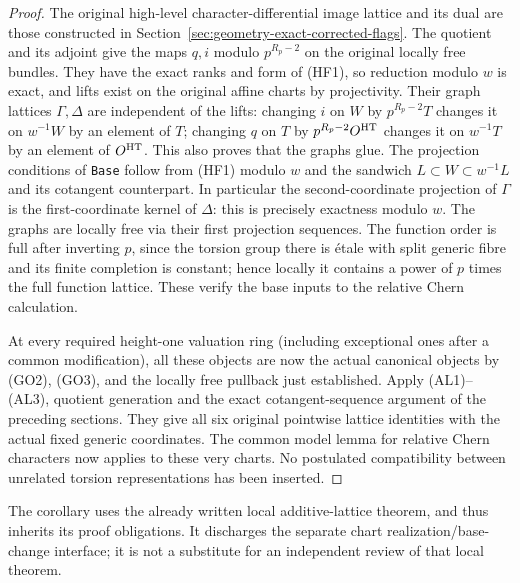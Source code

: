 \begin{proof}
The original high-level character-differential image
lattice and its dual are those constructed in
Section~\ref{sec:geometry-exact-corrected-flags}.
The quotient and its adjoint give the maps \(q,i\) modulo
\(p^{R_p-2}\) on the original locally free bundles.
They have the exact ranks and form of (HF1), so reduction
modulo \(w\) is exact, and lifts exist on the original
affine charts by projectivity. Their graph lattices
\(\Gamma,\Delta\) are independent of the lifts: changing
\(i\) on \(W\) by \(p^{R_p-2}T\) changes it on
\(w^{-1}W\) by an element of \(T\); changing \(q\) on
\(T\) by \(p^{R_p-2}O^{\rm HT}\) changes it on
\(w^{-1}T\) by an element of \(O^{\rm HT}\).
This also proves that the graphs glue. The projection
conditions of \texttt{Base} follow from (HF1) modulo \(w\)
and the sandwich \(L\subset W\subset w^{-1}L\) and
its cotangent counterpart. In particular the second-coordinate
projection of \(\Gamma\) is the first-coordinate kernel
of \(\Delta\): this is precisely exactness modulo \(w\).
The graphs are locally free via their first projection
sequences. The function order is full after inverting
\(p\), since the torsion group there is \'etale with
split generic fibre and its finite completion is constant;
hence locally it contains a power of \(p\) times the full
function lattice. These verify the base inputs to the
relative Chern calculation.

At every required height-one valuation ring (including
exceptional ones after a common modification), all these
objects are now the actual canonical objects by (GO2),
(GO3), and the locally free pullback just established.
Apply (AL1)--(AL3), quotient generation and the exact
cotangent-sequence argument of the preceding sections.
They give all six original pointwise lattice identities
with the actual fixed generic coordinates. The common
model lemma for relative Chern characters now applies
to these very charts. No postulated compatibility between
unrelated torsion representations has been inserted.
\end{proof}

The corollary uses the already written local additive-lattice
theorem, and thus inherits its proof obligations. It discharges
the separate chart realization/base-change interface; it is
not a substitute for an independent review of that local theorem.
